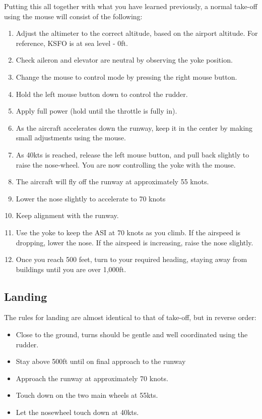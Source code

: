 Putting this all together with what you have learned previously, a normal
take-off using the mouse will consist of the following:

\begin{enumerate}
  \item Adjust the altimeter to the correct altitude, based on the airport
  altitude. For reference, KSFO is at sea level - 0ft.
	\item Check aileron and elevator are neutral by observing the yoke position.
  \item Change the mouse to control mode by pressing the right mouse button.
  \item Hold the left mouse button down to control the rudder.
  \item Apply full power (hold  until the throttle is fully in).
  \item As the aircraft accelerates down the runway, keep it in the center by
  making small adjustments using the mouse.
  \item As 40kts is reached, release the left mouse button, and pull back 
  slightly to raise the nose-wheel. You are now controlling the yoke with the
  mouse.
  \item The aircraft will fly off the runway at approximately 55 knots.
  \item Lower the nose slightly to accelerate to 70 knots
  \item Keep alignment with the runway.
  \item Use the yoke to keep the ASI at 70 knots as you climb. If the airspeed
  is dropping, lower the nose. If the airspeed is increasing, raise the nose
  slightly.
  \item Once you reach 500 feet, turn to your required heading, staying away from
  buildings until you are over 1,000ft.
\end{enumerate}

\subsection{Landing}
\label{sec:Ladowanie}
  
The rules for landing are almost identical to that of take-off, but in reverse
order:
\begin{itemize}
	\item Close to the ground, turns should be gentle and well coordinated
  using the rudder. 
  \item Stay above 500ft until on final approach to the runway
	\item Approach the runway at approximately 70 knots. 
	\item Touch down on the two main wheels at 55kts.
  \item Let the nosewheel touch down at 40kts.
\end{itemize}

